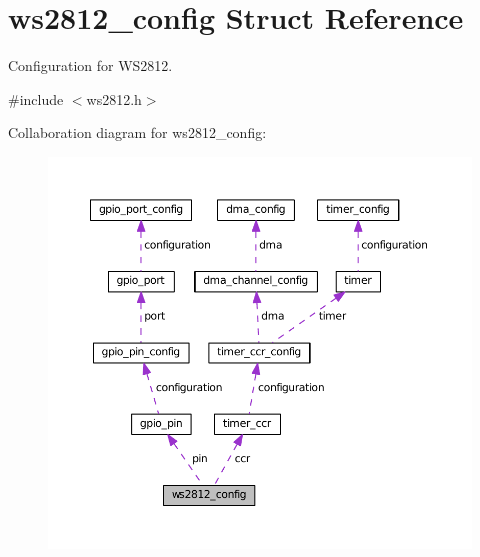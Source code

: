 \hypertarget{structws2812__config}{}\section{ws2812\+\_\+config Struct Reference}
\label{structws2812__config}


Configuration for W\+S2812.  




{\ttfamily \#include $<$ws2812.\+h$>$}



Collaboration diagram for ws2812\+\_\+config\+:\nopagebreak
\begin{figure}[H]
\begin{center}
\leavevmode
\includegraphics[width=350pt]{structws2812__config__coll__graph}
\end{center}
\end{figure}
